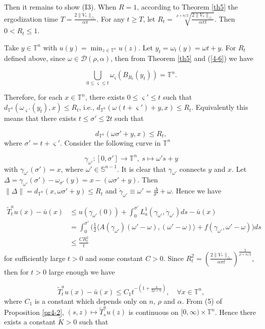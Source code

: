 \documentclass{amsart}[12pt]
\theoremstyle{definition}
\theoremstyle{remark}
\numberwithin{equation}{section}
\begin{document}
Then it remains to show (I3). When $R=1$, according to Theorem
\ref{th5} the ergodization time
$T=\frac{2\|V_*\|_\triangle}{\alpha\pi}$. For any $t\geq T$, let
$R_t=\sqrt[\rho+n/2]{\frac{2\|V_*\|_\triangle}{\alpha\pi t}}$.
Then $0<R_t\leq 1$.

Take $y\in\mathbb{T}^n$ with $u(y)=\min_{z\in\mathbb{T}^n}u(z)$.
Let $y_t=\omega_t(y)=\omega t+y$. For $R_t$ defined above, since
$\omega\in\mathcal{D}(\rho,\alpha)$, then from Theorem \ref{th5}
and (\ref{4-6}) we have

\[
\bigcup_{0\leq\varsigma\leq
t}\omega_\varsigma(B_{R_t}(y_t))=\mathbb{T}^n.
\]

Therefore, for each $x\in\mathbb{T}^n$, there exists
$0\leq\varsigma'\leq t$ such that
$d_{\mathbb{T}^n}(\omega_{\varsigma'}(y_t),x)\leq R_t$, i.e.,
$d_{\mathbb{T}^n}(\omega(t+\varsigma')+y,x)\leq R_t$. Equivalently
this means that there exists $t\leq \sigma'\leq 2t$ such that

\[
d_{\mathbb{T}^n}(\omega \sigma'+y,x)\leq R_t,
\]
where $\sigma'=t+\varsigma'$. Consider the following curve in
$\mathbb{T}^n$

\[
\gamma_{\omega'}:[0,\sigma']\rightarrow\mathbb{T}^n,\  s\mapsto
\omega's+y
\]
with $\gamma_{\omega'}(\sigma')=x$, where
$\omega'\in\mathbb{S}^{n-1}$. It is clear that $\gamma_{\omega'}$
connects $y$ and $x$. Let
$\Delta=\gamma_{\omega'}(\sigma')-\omega_{\sigma'}(y)=x-(\omega
\sigma'+y)$. Then $\|\Delta\|=d_{\mathbb{T}^n}(x,\omega
\sigma'+y)\leq R_t$ and
$\dot{\gamma}_{\omega'}\equiv\omega'=\frac{\Delta}{\sigma'}+\omega$.
Hence we have

\begin{align*}
\tilde{T}^a_tu(x)-\bar{u}(x) & \leq u(\gamma_{\omega'}(0))+\int_0^{\sigma'}L^1_a(\gamma_{\omega'},\dot{\gamma}_{\omega'})ds-\bar{u}(x)\\
                           & =\int_0^{\sigma'}\Big(\frac{1}{2}\langle
                           A(\gamma_{\omega'})(\omega'-\omega),(\omega'-\omega)\rangle+f(\gamma_{\omega'},\omega'-\omega)\Big)ds\\
                           &\leq \frac{CR_t^2}{t}
\end{align*}
for sufficiently large $t>0$ and some constant $C>0$. Since
$R_t^2=(\frac{2\|V_*\|_\triangle}{\alpha\pi
t})^{\frac{2}{\rho+n/2}}$, then for $t>0$ large enough we have

\[
\tilde{T}^a_tu(x)-\bar{u}(x)\leq C_1t^{-(1+\frac{4}{2\rho+n})},
\quad \forall x\in\mathbb{T}^n,
\]
where $C_1$ is a constant which depends only on $n$, $\rho$ and
$\alpha$. From (5) of Proposition \ref{pr4-2}, $(s,z)\mapsto
\tilde{T}^a_s u(z)$ is continuous on
$[0,\infty)\times\mathbb{T}^n$. Hence there exists a constant
$\tilde{K}>0$ such that
\end{document}
